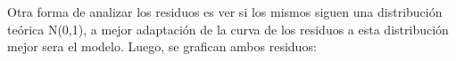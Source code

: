 Otra forma de analizar los residuos es ver si los mismos siguen una distribución teórica N(0,1), a mejor adaptación de la curva de los residuos a esta distribución mejor sera el modelo.
Luego, se grafican ambos residuos:\\



\begin{figure}[H]
\end{figure}



